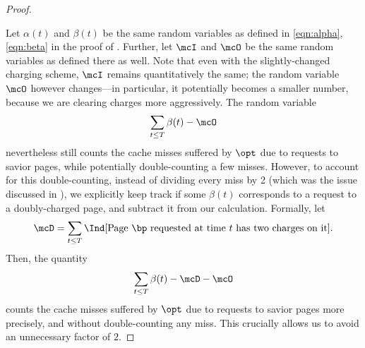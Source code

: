 \begin{proof}
\begin{figure}[H]
    \end{figure}
    Let $\alpha(t)$ and $\beta(t)$ be the same random variables as defined in \eqref{eqn:alpha}, \eqref{eqn:beta} in the proof of . Further, let $\mcI$ and $\mcO$ be the same random variables as defined there as well. Note that even with the slightly-changed charging scheme, $\mcI$ remains quantitatively the same; the random variable $\mcO$ however changes---in particular, it potentially becomes a smaller number, because we are clearing charges more aggressively. The random variable
    \begin{align*}
        \sum_{t \le T}\beta(t) - \mcO
    \end{align*}
    nevertheless still counts the cache misses suffered by $\opt$ due to requests to savior pages, while potentially double-counting a few misses. However, to account for this double-counting, instead of dividing every miss by 2 (which was the issue discussed in ), we explicitly keep track if some $\beta(t)$ corresponds to a request to a doubly-charged page, and subtract it from our calculation. Formally, let
    \begin{align}
        \mcD = \sum_{t \le T}\Ind[\text{Page $\bp$ requested at time $t$ has two charges on it}]. \label{eqn:D}
    \end{align}
    Then, the quantity
    \begin{align*}
        \sum_{t \le T}\beta(t) - \mcD - \mcO
    \end{align*}
    counts the cache misses suffered by $\opt$ due to requests to savior pages more precisely, and without double-counting any miss. This crucially allows us to avoid an unnecessary factor of $2$.


\end{proof}
